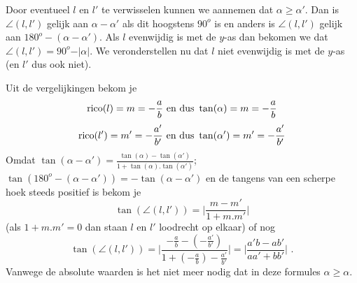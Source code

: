 Door eventueel $l$ en $l'$ te verwisselen kunnen we aannemen dat $\alpha \geq \alpha '$.
Dan is $\angle (l,l')$ gelijk aan $\alpha - \alpha '$ als dit hoogstens $90^o$ is en anders is $\angle (l,l')$ gelijk aan $180^o-(\alpha - \alpha ')$.
Als $l$ evenwijdig is met de $y$-as dan bekomen we dat $\angle (l,l')=90^o-\vert \alpha \vert$.
We veronderstellen nu dat $l$ niet evenwijdig is met de $y$-as (en $l'$ dus ook niet).

Uit de vergelijkingen bekom je
\[
\operatorname{rico} (l)=m=-\frac {a}{b} \text { en dus } \tan (\alpha )=m=-\frac{a}{b}
\]
\[
\operatorname{rico} (l')=m'=-\frac{a'}{b'} \text { en dus } \tan(\alpha ')=m'=-\frac{a'}{b'}
\]
Omdat $\tan (\alpha -\alpha ')=\frac{\tan (\alpha)-\tan (\alpha ')}{1+\tan (\alpha).\tan (\alpha ')}$; $\tan (180^o-(\alpha -\alpha '))=-\tan (\alpha -\alpha ')$ en de tangens van een scherpe hoek steeds positief is bekom je
\[
\tan (\angle (l,l'))=\vert \frac{m-m'}{1+m.m'} \vert
\]
(als $1+m.m'=0$ dan staan $l$ en $l'$ loodrecht op elkaar) of nog
\[
\tan (\angle (l,l'))=\vert \frac{-\frac{a}{b}-(-\frac{a'}{b'})}{1+(-\frac{a}{b})-\frac{a'}{b'}} \vert = \vert \frac{a'b-ab'}{aa'+bb'} \vert \text { .}
\]
Vanwege de absolute waarden is het niet meer nodig dat in deze formules $\alpha \geq \alpha$.\\



